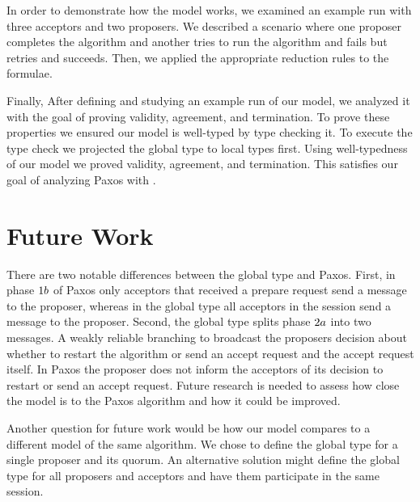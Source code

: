 In order to demonstrate how the model works, we examined an example run with three acceptors and two proposers.
We described a scenario where one proposer completes the algorithm and another tries to run the algorithm and fails but retries and succeeds.
Then, we applied the appropriate reduction rules to the formulae.

Finally, After defining and studying an example run of our model, we analyzed it with the goal of proving validity, agreement, and termination.
To prove these properties we ensured our model is well-typed by type checking it.
To execute the type check we projected the global type to local types first.
Using well-typedness of our model we proved validity, agreement, and termination.
This satisfies our goal of analyzing Paxos with \FTMPST.

\section{Future Work}
There are two notable differences between the global type and Paxos.
First, in phase $1b$ of Paxos only acceptors that received a prepare request send a message to the proposer, whereas in the global type all acceptors in the session send a message to the proposer.
Second, the global type splits phase $2a$ into two messages.
A weakly reliable branching to broadcast the proposers decision about whether to restart the algorithm or send an accept request and the accept request itself.
In Paxos the proposer does not inform the acceptors of its decision to restart or send an accept request.
Future research is needed to assess how close the model is to the Paxos algorithm and how it could be improved.

Another question for future work would be how our model compares to a different model of the same algorithm.
We chose to define the global type for a single proposer and its quorum.
An alternative solution might define the global type for all proposers and acceptors and have them participate in the same session.
